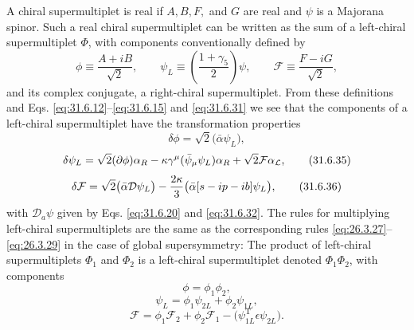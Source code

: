 A chiral supermultiplet is real if \(A,B,F,\) and \(G\) are real and
\(\psi\) is a Majorana spinor. Such a real chiral supermultiplet can be
written as the sum of a left-chiral supermultiplet \(\Phi\), with
components conventionally defined by
\begin{equation}
  \phi\equiv\frac{A+iB}{\sqrt{2}},\qquad
  \psi_L\equiv\left(\frac{1+\gamma_5}{2}\right)\psi,\qquad
  \mathcal F\equiv\frac{F-iG}{\sqrt{2}},
  \tag{31.6.33}\label{eq:31.6.33}
\end{equation}
and its complex conjugate, a right-chiral supermultiplet. From these
definitions and Eqs. \eqref{eq:31.6.12}--\eqref{eq:31.6.15} and
\eqref{eq:31.6.31} we see that the components of a left-chiral
supermultiplet have the transformation properties
\begin{equation}
  \delta\phi=\sqrt{2}\bigl(\bar\alpha\psi_L\bigr),
  \tag{31.6.34}\label{eq:31.6.34}
\end{equation}
\begin{equation}
  \delta\psi_L
  =\sqrt{2}(\sl{\partial}\phi)\alpha_R
   -\kappa\gamma^\mu(\bar\psi_\mu\psi_L)\alpha_R
   +\sqrt{2}\mathcal F\alpha_L,
  \tag{31.6.35}\label{eq:31.6.35}
\end{equation}
\begin{equation}
  \delta\mathcal F
  =\sqrt{2}\bigl(\bar\alpha\sl{\mathcal D}\psi_L\bigr)
   -\frac{2\kappa}{3}
    \bigl(\bar\alpha[s-ip-i\sl{b}]\psi_L\bigr),
  \tag{31.6.36}\label{eq:31.6.36}
\end{equation}
with \(\mathcal D_a\psi\) given by Eqs. \eqref{eq:31.6.20} and
\eqref{eq:31.6.32}. The rules for multiplying left-chiral
supermultiplets are the same as the corresponding rules
\eqref{eq:26.3.27}--\eqref{eq:26.3.29} in the case of global
supersymmetry: The product of left-chiral supermultiplets \(\Phi_1\)
and \(\Phi_2\) is a left-chiral supermultiplet denoted
\(\Phi_1\Phi_2\), with components
\begin{equation}
  \phi=\phi_1\phi_2,
  \tag{31.6.37}\label{eq:31.6.37}
\end{equation}
\begin{equation}
  \psi_L=\phi_1\psi_{2L}+\phi_2\psi_{1L},
  \tag{31.6.38}\label{eq:31.6.38}
\end{equation}
\begin{equation}
  \mathcal F
  =\phi_1\mathcal F_2+\phi_2\mathcal F_1
   -\bigl(\psi_{1L}^{\mathrm T}\epsilon\psi_{2L}\bigr).
  \tag{31.6.39}\label{eq:31.6.39}
\end{equation}

